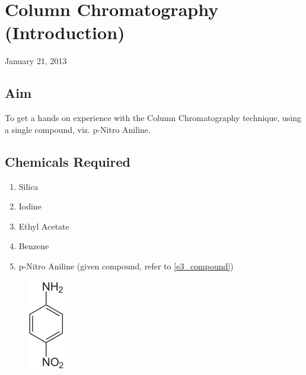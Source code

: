 \chapter{Column Chromatography (Introduction)}
\begin{flushright}
January 21, 2013
\end{flushright}
\section{Aim}
To get a hands on experience with the Column Chromatography technique, using a single compound, viz. p-Nitro Aniline.

\section {Chemicals Required}
	\begin{enumerate}
		\item Silica
		\item Iodine
		\item Ethyl Acetate
		\item Benzene
		\item p-Nitro Aniline (given compound, refer to \autoref{e3_compound})
	\end{enumerate}

	\begin{figure}[bth]
		\begin{center}
			\includegraphics[width=0.1\linewidth]{gfx/e3_compound}
		\end{center}
	\caption[p-Nitroanline]{\label{e3_compound}}
	\end{figure}


